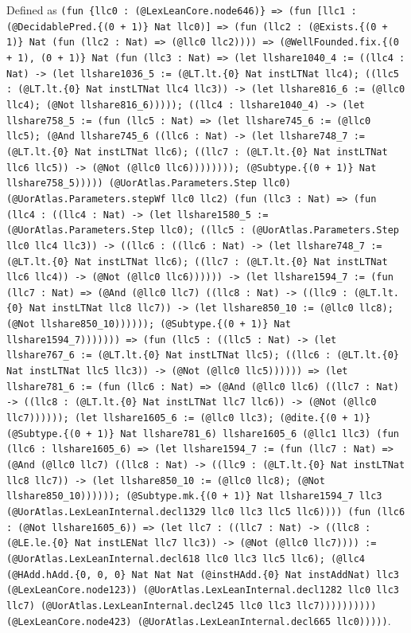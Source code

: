 \documentclass[11pt]{article}
\begin{document}
\noindent Defined as \texttt{(fun \{llc0 : (@LexLeanCore.node646)\} => (fun [llc1 : (@DecidablePred.\{(0 + 1)\} Nat llc0)] => (fun (llc2 : (@Exists.\{(0 + 1)\} Nat (fun (llc2 : Nat) => (@llc0 llc2)))) => (@WellFounded.fix.\{(0 + 1), (0 + 1)\} Nat (fun (llc3 : Nat) => (let llshare1040\_4 := ((llc4 : Nat) -> (let llshare1036\_5 := (@LT.lt.\{0\} Nat instLTNat llc4); ((llc5 : (@LT.lt.\{0\} Nat instLTNat llc4 llc3)) -> (let llshare816\_6 := (@llc0 llc4); (@Not llshare816\_6))))); ((llc4 : llshare1040\_4) -> (let llshare758\_5 := (fun (llc5 : Nat) => (let llshare745\_6 := (@llc0 llc5); (@And llshare745\_6 ((llc6 : Nat) -> (let llshare748\_7 := (@LT.lt.\{0\} Nat instLTNat llc6); ((llc7 : (@LT.lt.\{0\} Nat instLTNat llc6 llc5)) -> (@Not (@llc0 llc6)))))))); (@Subtype.\{(0 + 1)\} Nat llshare758\_5))))) (@UorAtlas.Parameters.Step llc0) (@UorAtlas.Parameters.stepWf llc0 llc2) (fun (llc3 : Nat) => (fun (llc4 : ((llc4 : Nat) -> (let llshare1580\_5 := (@UorAtlas.Parameters.Step llc0); ((llc5 : (@UorAtlas.Parameters.Step llc0 llc4 llc3)) -> ((llc6 : ((llc6 : Nat) -> (let llshare748\_7 := (@LT.lt.\{0\} Nat instLTNat llc6); ((llc7 : (@LT.lt.\{0\} Nat instLTNat llc6 llc4)) -> (@Not (@llc0 llc6)))))) -> (let llshare1594\_7 := (fun (llc7 : Nat) => (@And (@llc0 llc7) ((llc8 : Nat) -> ((llc9 : (@LT.lt.\{0\} Nat instLTNat llc8 llc7)) -> (let llshare850\_10 := (@llc0 llc8); (@Not llshare850\_10)))))); (@Subtype.\{(0 + 1)\} Nat llshare1594\_7))))))) => (fun (llc5 : ((llc5 : Nat) -> (let llshare767\_6 := (@LT.lt.\{0\} Nat instLTNat llc5); ((llc6 : (@LT.lt.\{0\} Nat instLTNat llc5 llc3)) -> (@Not (@llc0 llc5)))))) => (let llshare781\_6 := (fun (llc6 : Nat) => (@And (@llc0 llc6) ((llc7 : Nat) -> ((llc8 : (@LT.lt.\{0\} Nat instLTNat llc7 llc6)) -> (@Not (@llc0 llc7)))))); (let llshare1605\_6 := (@llc0 llc3); (@dite.\{(0 + 1)\} (@Subtype.\{(0 + 1)\} Nat llshare781\_6) llshare1605\_6 (@llc1 llc3) (fun (llc6 : llshare1605\_6) => (let llshare1594\_7 := (fun (llc7 : Nat) => (@And (@llc0 llc7) ((llc8 : Nat) -> ((llc9 : (@LT.lt.\{0\} Nat instLTNat llc8 llc7)) -> (let llshare850\_10 := (@llc0 llc8); (@Not llshare850\_10)))))); (@Subtype.mk.\{(0 + 1)\} Nat llshare1594\_7 llc3 (@UorAtlas.LexLeanInternal.decl1329 llc0 llc3 llc5 llc6)))) (fun (llc6 : (@Not llshare1605\_6)) => (let llc7 : ((llc7 : Nat) -> ((llc8 : (@LE.le.\{0\} Nat instLENat llc7 llc3)) -> (@Not (@llc0 llc7)))) := (@UorAtlas.LexLeanInternal.decl618 llc0 llc3 llc5 llc6); (@llc4 (@HAdd.hAdd.\{0, 0, 0\} Nat Nat Nat (@instHAdd.\{0\} Nat instAddNat) llc3 (@LexLeanCore.node123)) (@UorAtlas.LexLeanInternal.decl1282 llc0 llc3 llc7) (@UorAtlas.LexLeanInternal.decl245 llc0 llc3 llc7)))))))))) (@LexLeanCore.node423) (@UorAtlas.LexLeanInternal.decl665 llc0)))))}.\par
\end{document}
